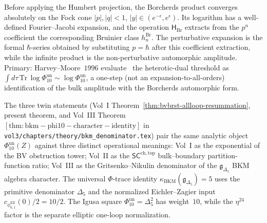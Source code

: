 \begin{remark}
\label{rem:htbb-allloop-exact-vs-pert}
Before applying the Humbert projection, the Borcherds product converges
absolutely on the Fock cone
$|p|, |q|<1$, $|y|\in(e^{-\epsilon}, e^\epsilon)$. Its logarithm has a
well-defined Fourier--Jacobi expansion, and the operation
$\mathsf H_{\mathrm{Br}}$ extracts from the $p^n$ coefficient the
corresponding Bruinier class $h_n^{\mathrm{Br}}$. The perturbative
expansion is
the formal $\hbar$-series obtained by substituting $p=\hbar$ after this
coefficient extraction, while the infinite product is the
non-perturbative automorphic amplitude. Primary:
Harvey--Moore~$1996$ evaluate~\cite[\S 5]{HarveyMoore1996} the
heterotic-dual threshold as
$\int d\tau\,\mathrm{Tr}\,\log\Phi_{10}^{\mathrm{un}}\sim\log\Phi_{10}^{\mathrm{un}}$,
a one-step (not an expansion-to-all-orders) identification of the
bulk amplitude with the Borcherds automorphic form.
\end{remark}

\begin{remark}
\label{rem:htbb-allloop-cross-volume}
The three twin statements
(Vol~I Theorem~\ref{thm:bvbrst-allloop-resummation}, present theorem,
and Vol~III Theorem~$\mathrm{[thm:bkm-phi10-character-identity]}$ in
\texttt{vol3/chapters/theory/bkm\_denominator.tex}) pair the same
analytic object $\Phi_{10}^{\mathrm{un}}(Z)$ against three distinct operational
meanings: Vol~I as the exponential of the BV obstruction tower;
Vol~II as the $\mathsf{SC}^{\mathrm{ch,top}}$ bulk--boundary
partition-function ratio; Vol~III as the Gritsenko--Nikulin
denominator of the $\mathfrak{g}_{\Delta_5}$ BKM algebra character.
The universal $\Phi$-trace identity
$\kappa_{\mathrm{BKM}}(\mathfrak{g}_{\Delta_5}) = 5$ uses the primitive
denominator $\Delta_5$ and the normalized Eichler--Zagier input
$c_{\phi_{0,1}^{\mathrm{EZ}}}(0)/2=10/2$. The Igusa square
$\Phi_{10}^{\mathrm{un}}=\Delta_5^2$ has weight~$10$, while the
$\eta^{24}$ factor is the separate elliptic one-loop normalization.
\end{remark}
